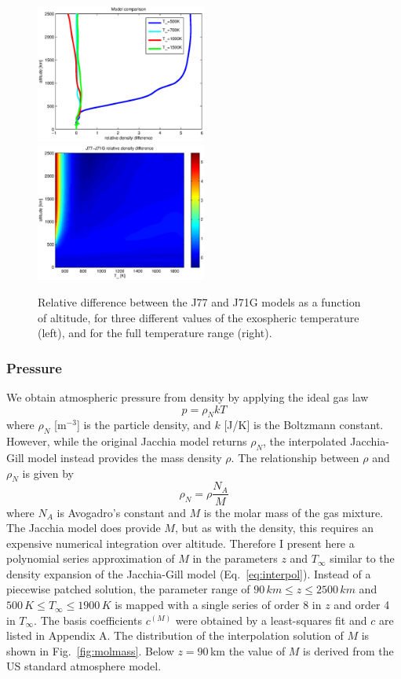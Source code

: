 \documentclass[Orbiter Technical Reference.tex]{subfiles}
\begin{document}
\begin{figure}
\includegraphics[width=0.5\textwidth]{dens_relerr.eps}
\includegraphics[width=0.5\textwidth]{dens_relerr2.eps}
\caption{Relative difference between the J77 and J71G models as a function of altitude, for three different values of the exospheric temperature (left), and for the full temperature range (right).}
\label{fig:denserr}
\end{figure}

\subsubsection{Pressure}
 
We obtain atmospheric pressure from density by applying the ideal gas law
\begin{equation}
p = \rho_N k T
\end{equation}
where $\rho_N$ [m$^{-3}$] is the particle density, and $k$ [J/K] is the Boltzmann constant. However, while the original Jacchia model returns $\rho_N$, the interpolated Jacchia-Gill model instead provides the mass density $\rho$. The relationship between $\rho$ and $\rho_N$ is given by
\begin{equation}
\rho_N = \rho \frac{N_A}{M}
\end{equation}
where $N_A$ is Avogadro's constant and $M$ is the molar mass of the gas mixture. The Jacchia model does provide $M$, but as with the density, this requires an expensive numerical integration over altitude. Therefore I present here a polynomial series approximation of $M$ in the parameters $z$ and $T_\infty$ similar to the density expansion of the Jacchia-Gill model (Eq.~\ref{eq:interpol}). Instead of a piecewise patched solution, the parameter range of $90\,km \leq z \leq 2500\,km$ and $500\,K \leq T_\infty \leq 1900\,K$ is mapped with a single series of order 8 in $z$ and order 4 in $T_\infty$. The basis coefficients $c^{(M)}$ were obtained by a least-squares fit and $c$ are listed in Appendix A. The distribution of the interpolation solution of $M$ is shown in Fig.~\ref{fig:molmass}. Below $z=90$\,km the value of $M$ is derived from the US standard atmosphere model.
\end{document}
